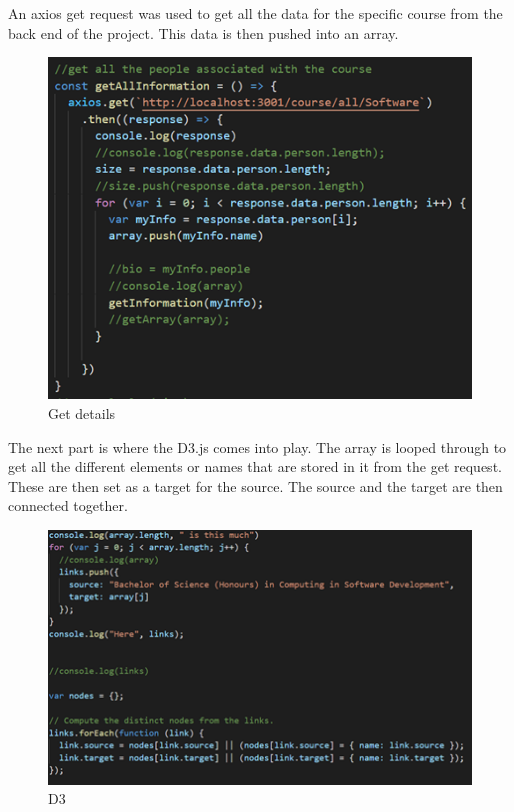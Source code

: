 An axios get request was used to get all the data for the specific course from the back end of the project. This data is then pushed into an array. 
\\
\begin{figure}[H]
    \centering
    \includegraphics{img/Graph2.png}
    \caption{Get details} 
    \label{fig:my_label}
\end{figure}

The next part is where the D3.js comes into play. The array is looped through to get all the different elements or names that are stored in it from the get request. These are then set as a target for the source. The source and the target are then connected together. \\
\begin{figure}[H]
    \centering
    \includegraphics{img/Graph3.png}
    \caption{D3} 
    \label{fig:my_label}
\end{figure}


